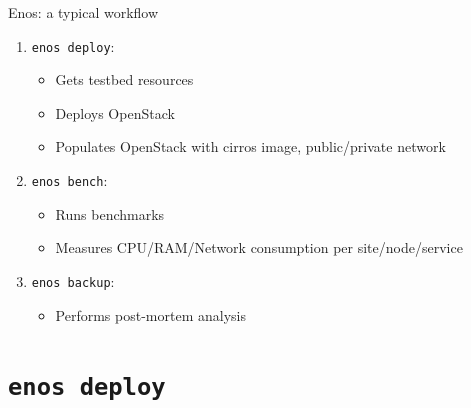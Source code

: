 \documentclass[10pt]{beamer}
\begin{document}
\begin{frame}{Enos: a typical workflow}
\begin{enumerate}
\item \texttt{enos deploy}:
  \begin{itemize}
  \item Gets testbed resources
  \item Deploys OpenStack
  \item Populates OpenStack with cirros image, public/private network
  \end{itemize}
\item \texttt{enos bench}:
  \begin{itemize}
  \item Runs benchmarks
  \item Measures CPU/RAM/Network consumption per site/node/service
  \end{itemize}
\item \texttt{enos backup}:
  \begin{itemize}
  \item Performs post-mortem analysis
  \end{itemize}
\end{enumerate}
\end{frame}



\section{\texttt{enos deploy}}
\end{document}
